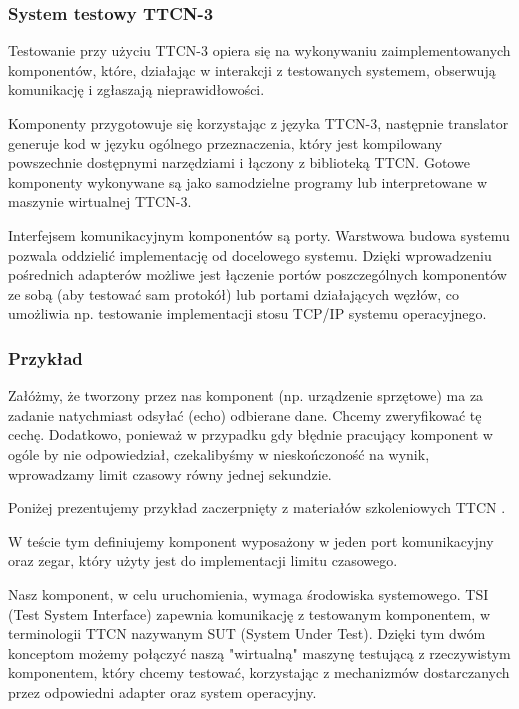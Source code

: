 \documentclass[00-praca-magisterska.tex]{subfiles}
\begin{document}
\subsubsection{System testowy TTCN-3}

Testowanie przy użyciu TTCN-3 opiera się na wykonywaniu zaimplementowanych
komponentów, które, działając w interakcji z testowanych systemem, obserwują
komunikację i zgłaszają nieprawidłowości.

Komponenty przygotowuje się korzystając z języka TTCN-3, następnie translator
generuje kod w języku ogólnego przeznaczenia, który jest kompilowany powszechnie
dostępnymi narzędziami i łączony z biblioteką TTCN. Gotowe komponenty wykonywane
są jako samodzielne programy lub interpretowane w maszynie wirtualnej TTCN-3.

Interfejsem komunikacyjnym komponentów są porty. Warstwowa budowa systemu
pozwala oddzielić implementację od docelowego systemu. Dzięki wprowadzeniu
pośrednich adapterów możliwe jest łączenie portów poszczególnych komponentów ze
sobą (aby testować sam protokół) lub portami działających węzłów, co umożliwia
np. testowanie implementacji stosu TCP/IP systemu operacyjnego.

\subsubsection{Przykład}

Załóżmy, że tworzony przez nas komponent (np. urządzenie sprzętowe) ma za
zadanie natychmiast odsyłać (echo) odbierane dane. Chcemy zweryfikować tę
cechę. Dodatkowo, ponieważ w przypadku gdy błędnie pracujący komponent w ogóle
by nie odpowiedział, czekalibyśmy w nieskończoność na wynik, wprowadzamy limit
czasowy równy jednej sekundzie.

Poniżej prezentujemy przykład zaczerpnięty z materiałów szkoleniowych
TTCN \cite{ttcn-reference}.

W teście tym definiujemy komponent  wyposażony w jeden port
komunikacyjny oraz zegar, który użyty jest do implementacji limitu czasowego.

Nasz komponent, w celu uruchomienia, wymaga środowiska systemowego. TSI (Test
System Interface) zapewnia komunikację z testowanym komponentem, w terminologii
TTCN nazywanym SUT (System Under Test). Dzięki tym dwóm konceptom możemy
połączyć naszą "wirtualną" maszynę testującą z rzeczywistym komponentem, który
chcemy testować, korzystając z mechanizmów dostarczanych przez odpowiedni
adapter oraz system operacyjny.
\end{document}
